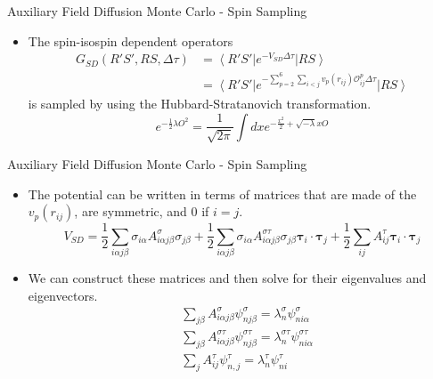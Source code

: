 \documentclass{beamer}
\newcommand{\ket}[1]{\left| #1 \right>}
\newcommand{\bra}[1]{\left< #1 \right|}
\newcommand{\Opij}{\mathcal{O}_{ij}^p}
\newcommand{\dt}{\Delta\tau}
\newcommand{\ti}{\bm{\tau}_i}
\newcommand{\tj}{\bm{\tau}_j}
\begin{document}
\begin{frame}{Auxiliary Field Diffusion Monte Carlo - Spin Sampling}
\begin{itemize}
   \item The spin-isospin dependent operators
   \begin{align*}
      G_{SD}(R'S',RS,\dt) &= \bra {R'S'}e^{-V_{SD}\dt} \ket{RS} \\
         &= \bra {R'S'}e^{-\sum\limits_{p=2}^6\sum\limits_{i<j}v_p(r_{ij})\Opij\dt} \ket{RS}
   \end{align*}
   is sampled by using the Hubbard-Stratanovich transformation.
   \begin{equation*}
      e^{-\frac{1}{2}\lambda O^2} = \frac{1}{\sqrt{2\pi}} \int dx e^{-\frac{x^2}{2} + \sqrt{-\lambda}xO}
   \end{equation*}
\end{itemize}
\end{frame}

\begin{frame}{Auxiliary Field Diffusion Monte Carlo - Spin Sampling}
\begin{itemize}
   \item The potential can be written in terms of matrices that are made of the $v_p(r_{ij})$, are symmetric, and 0 if $i=j$.
   \begin{equation*}
      V_{SD} = \frac{1}{2}\sum\limits_{i\alpha j\beta} \sigma_{i\alpha}A^{\sigma}_{i\alpha j\beta}\sigma_{j\beta}
      + \frac{1}{2}\sum\limits_{i\alpha j\beta} \sigma_{i\alpha}A^{\sigma\tau}_{i\alpha j\beta}\sigma_{j\beta}\ti\cdot\tj
      + \frac{1}{2}\sum\limits_{ij} A^{\tau}_{ij}\ti\cdot\tj
   \end{equation*}
   \item We can construct these matrices and then solve for their eigenvalues and eigenvectors.
\begin{align*}
   &\sum\limits_{j\beta} A^{\sigma}_{i\alpha j\beta}\psi^{\sigma}_{nj\beta} = \lambda^{\sigma}_n\psi^{\sigma}_{ni\alpha} \\
   &\sum\limits_{j\beta} A^{\sigma\tau}_{i\alpha j\beta}\psi^{\sigma\tau}_{n j\beta} = \lambda^{\sigma\tau}_n\psi^{\sigma\tau}_{ni\alpha} \\
   &\sum\limits_{j} A^{\tau}_{ij}\psi^{\tau}_{n,j} = \lambda^{\tau}_n\psi^{\tau}_{ni}
\end{align*}
\end{itemize}
\end{frame}
\end{document}
